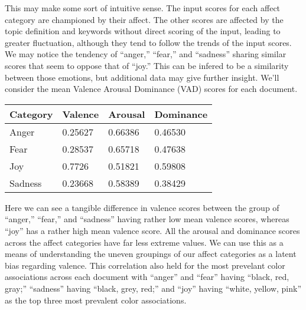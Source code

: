 \documentclass[11pt, twoside, reqno]{book}
\begin{document}
This may make some sort of intuitive sense. The input scores for each affect category are championed by their affect. The other scores are affected by the topic definition and keywords without direct scoring of the input, leading to greater fluctuation, although they tend to follow the trends of the input scores. We may notice the tendency of ``anger,'' ``fear,'' and ``sadness'' sharing similar scores that seem to oppose that of ``joy.'' This can be infered to be a similarity between those emotions, but additional data may give further insight. We'll consider the mean Valence Arousal Dominance (VAD) scores for each document.

\begin{table}[h!]
    \raggedright
    \begin{tabular}{|l|l|l|l|}
    \hline
        Category & Valence & Arousal & Dominance \\ \hline
        Anger & 0.25627 & 0.66386 & 0.46530 \\ \hline
        Fear & 0.28537 & 0.65718 & 0.47638 \\ \hline
        Joy & 0.7726 & 0.51821 & 0.59808 \\ \hline
        Sadness & 0.23668 & 0.58389 & 0.38429 \\ \hline
    \end{tabular}
\end{table}

Here we can see a tangible difference in valence scores between the group of ``anger,'' ``fear,'' and ``sadness'' having rather low mean valence scores, whereas ``joy'' has a rather high mean valence score. All the arousal and dominance scores across the affect categories have far less extreme values. We can use this as a means of understanding the uneven groupings of our affect categories as a latent bias regarding valence. This correlation also held for the most prevelant color associations across each document with ``anger'' and ``fear'' having ``black, red, gray;'' ``sadness'' having ``black, grey, red;'' and ``joy'' having ``white, yellow, pink'' as the top three most prevalent color associations.
\end{document}
